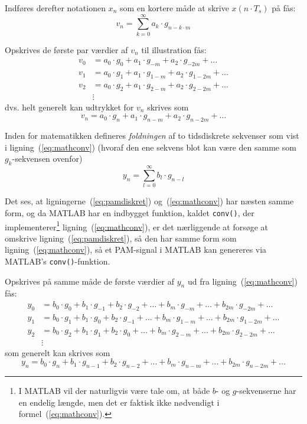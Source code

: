 \documentclass[dvips,11pt,a4paper]{article}
\begin{document}
\noindent{}Indføres derefter notationen $x_n$ som en kortere måde at skrive $x(n \cdot T_s)$ på fås:
\begin{equation}
v_n = \sum_{k=0}^{\infty} a_{k} \cdot g_{n - k \cdot m}
\label{eq:pamdiskret}
\end{equation}

\noindent{}Opskrives de første par værdier af $v_n$ til illustration fås:
\begin{align*}
v_0 &= a_{0}\cdot{}g_{0} + a_{1}\cdot{}g_{-m} + a_{2}\cdot{}g_{-2m} + \ldots \\
v_1 &= a_{0}\cdot{}g_{1} + a_{1}\cdot{}g_{1-m} + a_{2}\cdot{}g_{1-2m} + \ldots \\
v_2 &= a_{0}\cdot{}g_{2} + a_{1}\cdot{}g_{2-m} + a_{2}\cdot{}g_{2-2m} + \ldots \\ &\vdots
\end{align*}
dvs. helt generelt kan udtrykket for $v_n$ skrives som
\begin{equation}
v_{n} = a_{0}\cdot{}g_{n} + a_{1}\cdot{}g_{n-m} + a_{2}\cdot{}g_{n-2m} + \ldots{} 
\label{eq:v_n}
\end{equation}

\noindent{}Inden for matematikken defineres {\em foldningen} af to tidsdiskrete sekvenser som vist i ligning~(\ref{eq:mathconv}) (hvoraf den ene sekvens blot kan være den samme som $g_k$-sekvensen ovenfor)
\begin{equation}
y_n = \sum_{l=0}^{\infty} b_{l} \cdot g_{n-l}
\label{eq:mathconv}
\end{equation}

\noindent{}Det ses, at ligningerne~(\ref{eq:pamdiskret}) og~(\ref{eq:mathconv}) har næsten samme form, og da MATLAB har en indbygget funktion, kaldet \texttt{conv()}, der implementerer\footnote{I MATLAB vil der naturligvis være tale om, at både $b$- og $g$-sekvenserne har en endelig længde, men det er faktisk ikke nødvendigt i formel~(\ref{eq:mathconv}).}  ligning~(\ref{eq:mathconv}), er det nærliggende at forsøge at omskrive ligning~(\ref{eq:pamdiskret}), så den har samme form som ligning~(\ref{eq:mathconv}), så et PAM-signal i MATLAB kan genereres via MATLAB's \texttt{conv()}-funktion.

Opskrives på samme måde de første værdier af $y_n$ ud fra ligning~(\ref{eq:mathconv}) fås:
\begin{align*}
y_0 &= b_{0}\cdot{}g_{0} + b_{1}\cdot{}g_{-1} + b_{2}\cdot{}g_{-2} + \ldots + b_{m}\cdot{}g_{-m} + \ldots +  b_{2m}\cdot{}g_{-2m} + \ldots \\
y_1 &= b_{0}\cdot{}g_{1} + b_{1}\cdot{}g_{0} + b_{2}\cdot{}g_{-1} + \ldots + b_{m}\cdot{}g_{1-m} + \ldots +  b_{2m}\cdot{}g_{1-2m} + \ldots \\
y_2 &= b_{0}\cdot{}g_{2} + b_{1}\cdot{}g_{1} + b_{2}\cdot{}g_{0} + \ldots + b_{m}\cdot{}g_{2-m} + \ldots +  b_{2m}\cdot{}g_{2-2m} + \ldots \\
 &\vdots
\end{align*}
som generelt kan skrives som
\begin{equation}
y_n = b_{0}\cdot{}g_{n} + b_{1}\cdot{}g_{n-1} + b_{2}\cdot{}g_{n-2} + \ldots + b_{m}\cdot{}g_{n-m} + \ldots +  b_{2m}\cdot{}g_{n-2m} + \ldots
\label{eq:y_n}
\end{equation}
\end{document}
